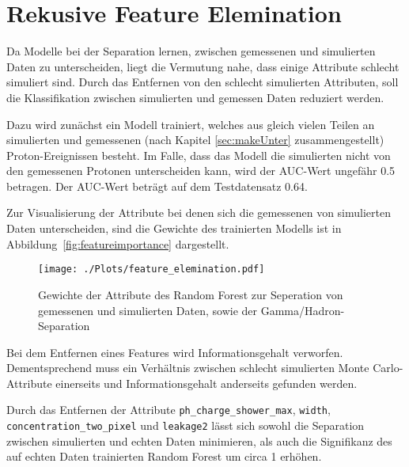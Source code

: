 \section{Rekusive Feature Elemination}
Da Modelle bei der Separation lernen, zwischen gemessenen und simulierten Daten zu unterscheiden, liegt die Vermutung nahe, dass einige Attribute schlecht simuliert sind.
Durch das Entfernen von den schlecht simulierten Attributen, soll die Klassifikation zwischen simulierten und gemessen Daten reduziert werden.

Dazu wird zunächst ein Modell trainiert, welches aus gleich vielen Teilen an simulierten und gemessenen (nach Kapitel \ref{sec:makeUnter} zusammengestellt) Proton-Ereignissen besteht. 
Im Falle, dass das Modell die simulierten nicht von den gemessenen Protonen unterscheiden kann, wird der AUC-Wert ungefähr 0.5 betragen. 
Der AUC-Wert beträgt auf dem Testdatensatz \num{0.64}. 

Zur Visualisierung der Attribute bei denen sich die gemessenen von simulierten Daten unterscheiden, sind die Gewichte des trainierten Modells ist in Abbildung~\ref{fig:featureimportance} dargestellt. 
\begin{figure}[H]
  \centering
  \texttt{[image: ./Plots/feature\_elemination.pdf]}
  \caption{Gewichte der Attribute des Random Forest zur Seperation von gemessenen und simulierten Daten, sowie der Gamma/Hadron-Separation }
\end{figure}
Bei dem Entfernen eines Features wird Informationsgehalt verworfen. 
Dementsprechend muss ein Verhältnis zwischen schlecht simulierten Monte Carlo-Attribute einerseits und Informationsgehalt anderseits gefunden werden.

Durch das Entfernen der Attribute \texttt{ph\_charge\_shower\_max}, \texttt{width}, \texttt{concentration\_two\_pixel} und \texttt{leakage2} lässt sich sowohl die Separation zwischen simulierten und echten Daten minimieren, als auch die Signifikanz des auf echten Daten trainierten Random Forest um circa \SI{1}{\sigma} erhöhen.
